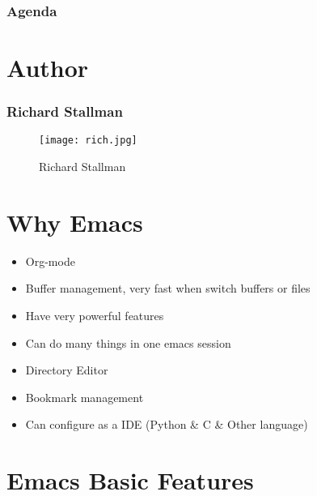 


\begin{frame}
  \titlepage
\end{frame}

\begin{frame}[plain]
  \frametitle{Agenda}
  \setcounter{tocdepth}{2}
  \tableofcontents
\end{frame}

\section{Author}
\begin{frame}
	\frametitle{Richard Stallman}
	\begin{figure}[htbp]
    \centering
    \texttt{[image: rich.jpg]}
    \caption{Richard Stallman}
    \label{fig:power}
    \end{figure}
\end{frame}
\section{Why Emacs}
\begin{frame}
    \begin{itemize}[<+-|alert@+>]
         \item Org-mode
         \item Buffer management, very fast when switch buffers or files
         \item Have very powerful features
         \item Can do many things in one emacs session
         \item Directory Editor
         \item Bookmark management
         \item Can configure as a IDE (Python \& C \& Other language)
    \end{itemize}
\end{frame}
\section{Emacs Basic Features}

